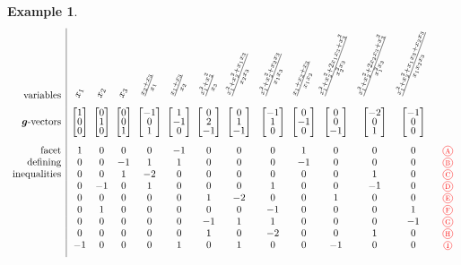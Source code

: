 \documentclass{amsart}
\theoremstyle{definition}
\newtheorem{example}[theorem]{Example}
\renewcommand{\b}[1]{{\boldsymbol{#1}}} %
\newcommand{\red}{\color{red}} %
\newcommand*\circled[1]{\tikz[baseline=(char.base)]{\node[shape=circle, draw, inner sep=1.5pt, scale=.7] (char) {#1};}}
\newcommand{\compactVectorT}[3]{\begin{bmatrix} #1 \\[-.1cm] #2 \\[-.1cm] #3 \end{bmatrix}}
\begin{document}
\begin{example}
\[
\begin{array}{r|c@{\;\;}c@{\;\;}c@{\;\;}c@{\;\;}c@{\;\;}c@{\;}c@{\;}c@{\;}c@{}c@{}c@{}cc}
\text{variables} & \rotatebox{70}{$x_1$} & \rotatebox{70}{$x_2$} & \rotatebox{70}{$x_3$} & \rotatebox{70}{$\frac{x_2 + x_3}{x_1}$} & \rotatebox{70}{$\frac{x_1 + x_3}{x_2}$} & \rotatebox{70}{$\frac{x_1^2 + x_2^2}{x_3}$} & \rotatebox{70}{$\frac{x_1^2 + x_2^2 + x_1 x_3}{x_2 x_3}$} & \rotatebox{70}{$\frac{x_1^2 + x_2^2 + x_2 x_3}{x_1 x_3}$} & \rotatebox{70}{$\frac{x_1 + x_2 + x_3}{x_1 x_2}$} & \rotatebox{70}{$\frac{x_1^2 + x_2^2 + 2 x_1 x_3 + x_3^2}{x_2^2 x_3}$} & \rotatebox{70}{$\frac{x_1^2 + x_2^2 + 2 x_2 x_3 + x_3^2}{x_1^2 x_3}$} & \rotatebox{70}{$\frac{x_1^2 + x_2^2 + x_1 x_3 + x_2 x_3}{x_1 x_2 x_3}$} \\[.2cm]
\text{$\b{g}$-vectors} & \compactVectorT{1}{0}{0} & \compactVectorT{0}{1}{0} & \compactVectorT{0}{0}{1} & \compactVectorT{-1}{0}{1} & \compactVectorT{1}{-1}{0} & \compactVectorT{0}{2}{-1} & \compactVectorT{0}{1}{-1} & \compactVectorT{-1}{1}{0} & \compactVectorT{0}{-1}{0} & \compactVectorT{0}{0}{-1} & \compactVectorT{-2}{0}{1} & \compactVectorT{-1}{0}{0}  \\[.6cm]
\text{facet}		& 1 & 0 & 0 & 0 & -1 & 0 & 0 & 0 & 1 & 0 & 0 & 0 & \red \circled{A} \\
\text{defining}		& 0 & 0 & -1 & 1 & 1 & 0 & 0 & 0 & -1 & 0 & 0 & 0 & \red \circled{B} \\
\text{inequalities}	& 0 & 0 & 1 & -2 & 0 & 0 & 0 & 0 & 0 & 0 & 1 & 0 & \red \circled{C} \\
					& 0 & -1 & 0 & 1 & 0 & 0 & 0 & 1 & 0 & 0 & -1 & 0 & \red \circled{D} \\
					& 0 & 0 & 0 & 0 & 0 & 1 & -2 & 0 & 0 & 1 & 0 & 0 & \red \circled{E} \\
					& 0 & 1 & 0 & 0 & 0 & 0 & 0 & -1 & 0 & 0 & 0 & 1 & \red \circled{F} \\
					& 0 & 0 & 0 & 0 & 0 & -1 & 1 & 1 & 0 & 0 & 0 & -1 & \red \circled{G} \\
					& 0 & 0 & 0 & 0 & 0 & 1 & 0 & -2 & 0 & 0 & 1 & 0 & \red \circled{H} \\
					& -1 & 0 & 0 & 0 & 1 & 0 & 1 & 0 & 0 & -1 & 0 & 0 & \red \circled{I} \\[.2cm]
\end{array}
\]


\end{example}
\end{document}
